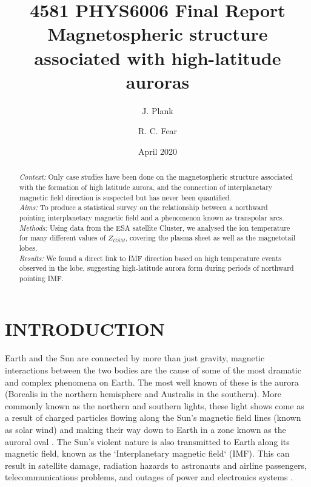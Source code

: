 \documentclass[12pt]{article}
\title{4581 PHYS6006 Final Report \\
       Magnetospheric structure associated with high-latitude auroras}
\author[1]{J. Plank}
\author[2]{R. C. Fear}
\affil[1, 2]{Department of Physics and Astronomy, University of Southampton}
\date{April 2020}
\begin{document}
\sloppy
\maketitle

\begin{abstract}
    \noindent\textit{Context:} Only case studies have been done on the magnetospheric structure associated with the formation of high latitude aurora, and the connection of interplanetary magnetic field direction is suspected but has never been quantified.\\
    \textit{Aims:} To produce a statistical survey on the relationship between a northward pointing interplanetary magnetic field and a phenomenon known as transpolar arcs.\\
    \textit{Methods:} Using data from the ESA satellite Cluster, we analysed the ion temperature for many different values of $Z_{GSM}$, covering the plasma sheet as well as the magnetotail lobes.\\
    \textit{Results:} We found a direct link to IMF direction based on high temperature events observed in the lobe, suggesting high-latitude aurora form during periods of northward pointing IMF.
\end{abstract}

\pagebreak

\tableofcontents
{}

\pagebreak


\section{INTRODUCTION}
Earth and the Sun are connected by more than just gravity, magnetic interactions between the two bodies are the cause of some of the most dramatic and complex phenomena on Earth. The most well known of these is the aurora (Borealis in the northern hemisphere and Australis in the southern). More commonly known as the northern and southern lights, these light shows come as a result of charged particles flowing along the Sun's magnetic field lines (known as solar wind) and making their way down to Earth in a zone known as the auroral oval \cite{AAAspaceweather}. The Sun's violent nature is also transmitted to Earth along its magnetic field, known as the `Interplanetary magnetic field` (IMF). This can result in satellite damage, radiation hazards to astronauts and airline passengers, telecommunications problems, and outages of power and electronics systems \cite{AAAspaceweather}.
\end{document}
